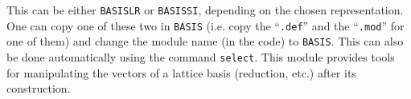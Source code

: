 
This can be either {\tt BASISLR} or {\tt BASISSI}, depending on the chosen
representation.
One can copy one of these two in {\tt BASIS} (i.e. copy the
``{\tt .def}'' and the ``{\tt .mod}'' for one of them)
and change the module name (in the code) to {\tt BASIS}.
This can also be done automatically using the command {\tt select}.
This module provides tools for manipulating the vectors of a lattice basis
(reduction, etc.) after its construction.
